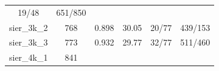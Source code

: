 \documentclass[]{article}
\begin{document}
\begin{longtable}[]{@{}cccccc@{}}
\begin{minipage}[t]{0.18\columnwidth}
19/48\strut
\end{minipage} & \begin{minipage}[t]{0.22\columnwidth}\centering\strut
651/850\strut
\end{minipage}\tabularnewline
\begin{minipage}[t]{0.11\columnwidth}\centering\strut
sier\_3k\_2\strut
\end{minipage} & \begin{minipage}[t]{0.07\columnwidth}\centering\strut
768\strut
\end{minipage} & \begin{minipage}[t]{0.11\columnwidth}\centering\strut
0.898\strut
\end{minipage} & \begin{minipage}[t]{0.13\columnwidth}\centering\strut
30.05\strut
\end{minipage} & \begin{minipage}[t]{0.18\columnwidth}\centering\strut
20/77\strut
\end{minipage} & \begin{minipage}[t]{0.22\columnwidth}\centering\strut
439/153\strut
\end{minipage}\tabularnewline
\begin{minipage}[t]{0.11\columnwidth}\centering\strut
sier\_3k\_3\strut
\end{minipage} & \begin{minipage}[t]{0.07\columnwidth}\centering\strut
773\strut
\end{minipage} & \begin{minipage}[t]{0.11\columnwidth}\centering\strut
0.932\strut
\end{minipage} & \begin{minipage}[t]{0.13\columnwidth}\centering\strut
29.77\strut
\end{minipage} & \begin{minipage}[t]{0.18\columnwidth}\centering\strut
32/77\strut
\end{minipage} & \begin{minipage}[t]{0.22\columnwidth}\centering\strut
511/460\strut
\end{minipage}\tabularnewline
\begin{minipage}[t]{0.11\columnwidth}\centering\strut
sier\_4k\_1\strut
\end{minipage} & \begin{minipage}[t]{0.07\columnwidth}\centering\strut
841\strut
\end{minipage} & \begin{minipage}[t]{0.11\columnwidth}\centering\strut

\end{minipage}
\end{longtable}
\end{document}
